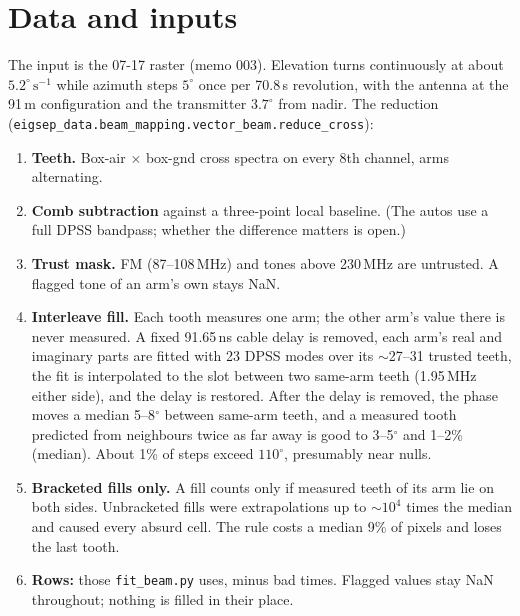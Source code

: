 \documentclass{aastex631}
\begin{document}
\section{Data and inputs} \label{sec:data}
The input is the 07-17 raster (memo 003). Elevation turns continuously at about $5.2^\circ\,\mathrm{s}^{-1}$
while azimuth steps $5^\circ$ once per 70.8\,s revolution, with the antenna at the 91\,m configuration and the
transmitter $3.7^\circ$ from nadir. The reduction (\texttt{eigsep\_data.beam\_mapping.vector\_beam.reduce\_cross}):
\begin{enumerate}
\item \textbf{Teeth.} Box-air $\times$ box-gnd cross spectra on every 8th channel, arms alternating.
\item \textbf{Comb subtraction} against a three-point local baseline. (The autos use a full DPSS bandpass;
  whether the difference matters is open.)
\item \textbf{Trust mask.} FM (87--108\,MHz) and tones above 230\,MHz are untrusted. A flagged tone of an arm's
  own stays NaN.
\item \textbf{Interleave fill.} Each tooth measures one arm; the other arm's value there is never measured. A
  fixed 91.65\,ns cable delay is removed, each arm's real and imaginary parts are fitted with 23 DPSS modes over
  its $\sim$27--31 trusted teeth, the fit is interpolated to the slot between two same-arm teeth (1.95\,MHz
  either side), and the delay is restored. After the delay is removed, the phase moves a median 5--8$^\circ$
  between same-arm teeth, and a measured tooth predicted from neighbours twice as far away is good to
  3--5$^\circ$ and 1--2\% (median). About 1\% of steps exceed $110^\circ$, presumably near nulls.
\item \textbf{Bracketed fills only.} A fill counts only if measured teeth of its arm lie on both sides.
  Unbracketed fills were extrapolations up to $\sim10^4$ times the median and caused every absurd cell. The
  rule costs a median 9\% of pixels and loses the last tooth.
\item \textbf{Rows:} those \texttt{fit\_beam.py} uses, minus bad times. Flagged values stay NaN throughout;
  nothing is filled in their place.
\end{enumerate}
\end{document}
